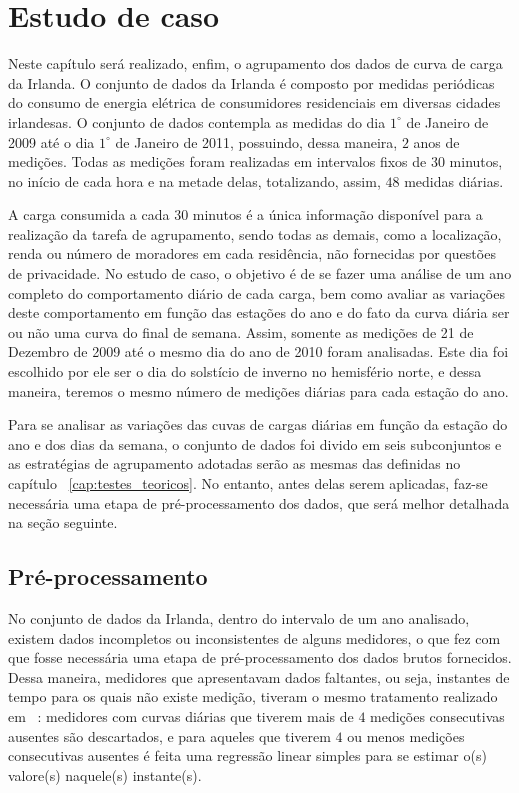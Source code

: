 \chapter{Estudo de caso}

Neste capítulo será realizado, enfim, o agrupamento dos dados de curva de carga da Irlanda. O conjunto de dados da Irlanda é composto por medidas periódicas do consumo de energia elétrica de consumidores residenciais em diversas cidades irlandesas. O conjunto de dados contempla as medidas do dia $1^{\circ}$  de Janeiro de 2009 até o dia $1^{\circ}$ de Janeiro de 2011, possuindo, dessa maneira, $2$ anos de medições. Todas as medições foram realizadas em intervalos fixos de $30$ minutos, no início de cada hora e na metade delas, totalizando, assim, $48$ medidas diárias.

A carga consumida a cada $30$ minutos é a única informação disponível para a realização da tarefa de agrupamento, sendo todas as demais, como a localização, renda ou número de moradores em cada residência, não fornecidas por questões de privacidade. No estudo de caso, o objetivo é de se fazer uma análise de um ano completo do comportamento diário de cada carga, bem como avaliar as variações deste comportamento em função das estações do ano e do fato da curva diária ser ou não uma curva do final de semana. Assim, somente as medições de 21 de Dezembro de 2009 até o mesmo dia do ano de 2010 foram analisadas. Este dia foi escolhido por ele ser o dia do solstício de inverno no hemisfério norte, e dessa maneira, teremos o mesmo número de medições diárias para cada estação do ano.

Para se analisar as variações das cuvas de cargas diárias em função da estação do ano e dos dias da semana, o conjunto de dados foi divido em seis subconjuntos e as estratégias de agrupamento adotadas serão as mesmas das definidas no capítulo ~\ref{cap:testes_teoricos}. No entanto, antes delas serem aplicadas, faz-se necessária uma etapa de pré-processamento dos dados, que será melhor detalhada na seção seguinte.

\section{Pré-processamento}

No conjunto de dados da Irlanda, dentro do intervalo de um ano analisado, existem dados incompletos ou inconsistentes de alguns medidores, o que fez com que fosse necessária uma etapa de pré-processamento dos dados brutos fornecidos. Dessa maneira, medidores que apresentavam dados faltantes, ou seja, instantes de tempo para os quais não existe medição, tiveram o mesmo tratamento realizado em ~\parencite{Flath2012}: medidores com curvas diárias que tiverem mais de $4$ medições consecutivas ausentes são descartados, e para aqueles que tiverem $4$ ou menos medições consecutivas ausentes é feita uma regressão linear simples para se estimar o(s) valore(s) naquele(s) instante(s).

